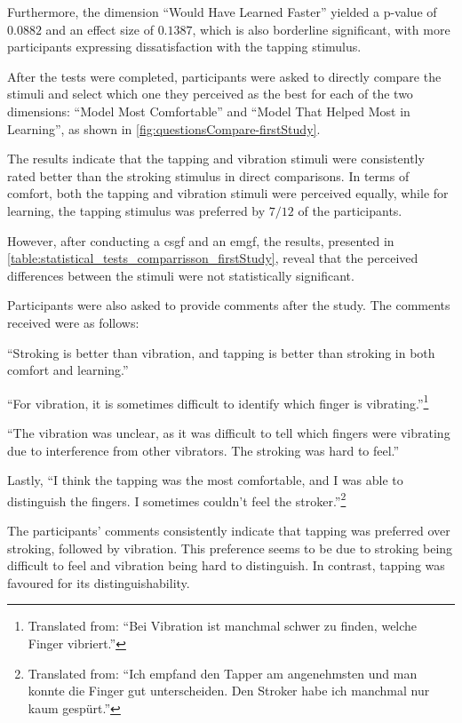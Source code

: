Furthermore, the dimension \enquote{Would Have Learned Faster} yielded a p-value of $0.0882$ and an effect size of $0.1387$, which is also borderline significant, with more participants expressing dissatisfaction with the tapping stimulus.

After the tests were completed, participants were asked to directly compare the stimuli and select which one they perceived as the best for each of the two dimensions: \enquote{Model Most Comfortable} and \enquote{Model That Helped Most in Learning}, as shown in \autoref{fig:questionsCompare-firstStudy}. 

The results indicate that the tapping and vibration stimuli were consistently rated better than the stroking stimulus in direct comparisons. In terms of comfort, both the tapping and vibration stimuli were perceived equally, while for learning, the tapping stimulus was preferred by $7/12$ of the participants. 

However, after conducting a \gls{csgf} and an \gls{emgf}, the results, presented in \autoref{table:statistical_tests_comparrisson_firstStudy}, reveal that the perceived differences between the stimuli were not statistically significant.

Participants were also asked to provide comments after the study. The comments received were as follows:

\enquote{Stroking is better than vibration, and tapping is better than stroking in both comfort and learning.}

\enquote{For vibration, it is sometimes difficult to identify which finger is vibrating.}\footnote{Translated from: \enquote{Bei Vibration ist manchmal schwer zu finden, welche Finger vibriert.}}

\enquote{The vibration was unclear, as it was difficult to tell which fingers were vibrating due to interference from other vibrators. The stroking was hard to feel.}

Lastly, \enquote{I think the tapping was the most comfortable, and I was able to distinguish the fingers. I sometimes couldn’t feel the stroker.}\footnote{Translated from: \enquote{Ich empfand den Tapper am angenehmsten und man konnte die Finger gut unterscheiden. Den Stroker habe ich manchmal nur kaum gespürt.}}

The participants' comments consistently indicate that tapping was preferred over stroking, followed by vibration. This preference seems to be due to stroking being difficult to feel and vibration being hard to distinguish. In contrast, tapping was favoured for its distinguishability.

